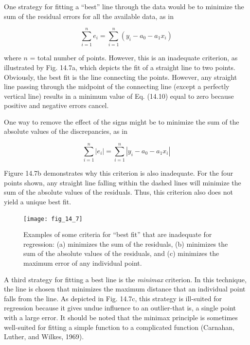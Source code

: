 \documentclass[../main.tex]{subfiles}
\begin{document}
\noindent One strategy for fitting a ``best'' line through the data would be to minimize the sum of the
residual errors for all the available data, as in

\begin{equation}
	\tag{14.10}
	\sum_{i=1}^n e_i = \sum^n_{i=1} (y_i - a_0 - a_1 x_i)
\end{equation}

where $n$ = total number of points. However, this is an inadequate criterion, as illustrated by
Fig. 14.7a, which depicts the fit of a straight line to two points. Obviously, the best fit is the
line connecting the points. However, any straight line passing through the midpoint of the
connecting line (except a perfectly vertical line) results in a minimum value of Eq. (14.10)
equal to zero because positive and negative errors cancel.

One way to remove the effect of the signs might be to minimize the sum of the absolute values of the discrepancies, as in

\begin{equation}
	\tag{14.11}
	\sum_{i=1}^n \left| e_i \right| = \sum^n_{i=1} \left| y_i - a_0 - a_1 x_i \right|
\end{equation}

\noindent Figure 14.7b demonstrates why this criterion is also inadequate. For the four points shown,
any straight line falling within the dashed lines will minimize the sum of the absolute values of the residuals. Thus, this criterion also does not yield a unique best fit.

\begin{figure}[H]
	\centering
	\texttt{[image: fig\_14\_7]} %
	\caption{\textsf{Examples of some criteria for ``best fit'' that are inadequate for regression: (a) minimizes the sum
	of the residuals, (b) minimizes the sum of the absolute values of the residuals, and (c) minimizes
	the maximum error of any individual point.}}
	\label{fig:fig_14_7}
\end{figure}

A third strategy for fitting a best line is the \textit{minimax} criterion. In this technique, the line
is chosen that minimizes the maximum distance that an individual point falls from the line.
As depicted in Fig. 14.7c, this strategy is ill-suited for regression because it gives undue
influence to an outlier-that is, a single point with a large error. It should be noted that
the minimax principle is sometimes well-suited for fitting a simple function to a complicated function (Carnahan, Luther, and Wilkes, 1969).
\end{document}

